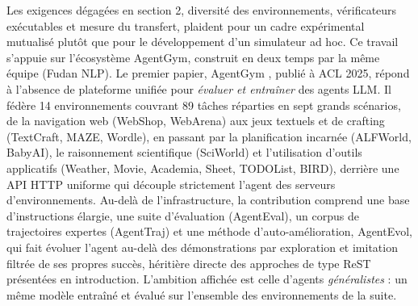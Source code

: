 \documentclass[11pt,a4paper]{article}
\begin{document}
Les exigences dégagées en section 2, diversité des environnements, vérificateurs exécutables et mesure du transfert, plaident pour un cadre expérimental mutualisé plutôt que pour le développement d'un simulateur ad hoc. Ce travail s'appuie sur l'écosystème AgentGym, construit en deux temps par la même équipe (Fudan NLP). Le premier papier, AgentGym \cite{xi_agentgym_2025}, publié à ACL 2025, répond à l'absence de plateforme unifiée pour \emph{évaluer et entraîner} des agents LLM. Il fédère 14 environnements couvrant 89 tâches réparties en sept grands scénarios, de la navigation web (WebShop, WebArena) aux jeux textuels et de crafting (TextCraft, MAZE, Wordle), en passant par la planification incarnée (ALFWorld, BabyAI), le raisonnement scientifique (SciWorld) et l'utilisation d'outils applicatifs (Weather, Movie, Academia, Sheet, TODOList, BIRD), derrière une API HTTP uniforme qui découple strictement l'agent des serveurs d'environnements. Au-delà de l'infrastructure, la contribution comprend une base d'instructions élargie, une suite d'évaluation (AgentEval), un corpus de trajectoires expertes (AgentTraj) et une méthode d'auto-amélioration, AgentEvol, qui fait évoluer l'agent au-delà des démonstrations par exploration et imitation filtrée de ses propres succès, héritière directe des approches de type ReST présentées en introduction. L'ambition affichée est celle d'agents \emph{généralistes} : un même modèle entraîné et évalué sur l'ensemble des environnements de la suite.
\end{document}
